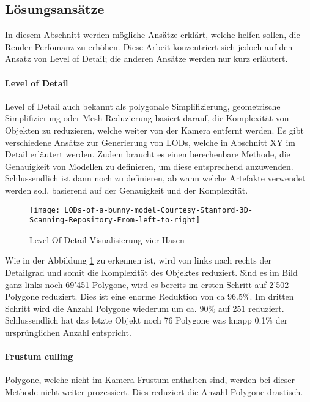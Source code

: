 \subsection{Lösungsansätze}
In diesem Abschnitt werden mögliche Ansätze erklärt, welche helfen sollen, die Render-Perfomanz zu erhöhen. Diese Arbeit konzentriert sich jedoch auf den Ansatz von Level of Detail; die anderen Ansätze werden nur kurz erläutert.

\paragraph{Level of Detail}
Level of Detail auch bekannt als polygonale Simplifizierung, geometrische Simplifizierung oder Mesh Reduzierung basiert darauf, die Komplexität von Objekten zu reduzieren, welche weiter von der Kamera entfernt werden. Es gibt verschiedene Ansätze zur Generierung von LODs, welche in Abschnitt XY im Detail erläutert werden. Zudem braucht es einen berechenbare Methode, die Genauigkeit von Modellen zu definieren, um diese entsprechend anzuwenden. Schlussendlich ist dann noch zu definieren, ab wann welche Artefakte verwendet werden soll, basierend auf der Genauigkeit und der Komplexität.

\begin{figure}[H]
\centering
\texttt{[image: LODs-of-a-bunny-model-Courtesy-Stanford-3D-Scanning-Repository-From-left-to-right]}
\caption{Level Of Detail Visualisierung vier Hasen}
\label{fig:LevelOfDetailVisualisierungvierHasen}
\end{figure}

Wie in der Abbildung \ref{fig:LevelOfDetailVisualisierungvierHasen} zu erkennen ist, wird von links nach rechts der Detailgrad und somit die Komplexität des Objektes reduziert. Sind es im Bild ganz links noch 69'451 Polygone, wird es bereits im ersten Schritt auf 2'502 Polygone reduziert. Dies ist eine enorme Reduktion von ca 96.5\%. Im dritten Schritt wird die Anzahl Polygone wiederum um ca. 90\% auf 251 reduziert. Schlussendlich hat das letzte Objekt noch 76 Polygone was knapp 0.1\% der ursprünglichen Anzahl entspricht.

\paragraph{Frustum culling}
Polygone, welche nicht im Kamera Frustum enthalten sind, werden bei dieser Methode nicht weiter prozessiert.
Dies reduziert die Anzahl Polygone drastisch.

